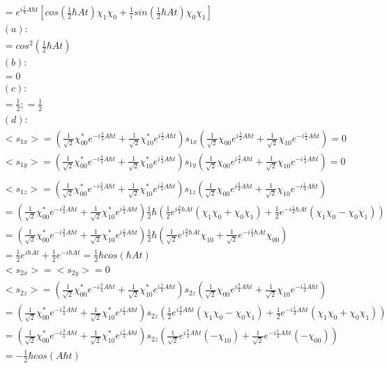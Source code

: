 \documentclass{article}
\begin{document}
\begin{align*}
  &= e^{i\frac14 A\hbar t}[cos(\frac12\hbar At)\chi_1\chi_0+\frac1isin(\frac12\hbar At)\chi_0\chi_1]\\
  &(a):\\
  &=cos^2(\frac12\hbar At)\\
  &(b):\\
  &=0\\
  &(c):\\
  &=\frac12;=\frac12\\
  &(d):\\
  &<s_{1x}>=(\frac1{\sqrt{2}}\chi_{00}^*e^{-i\frac34A\hbar t}+\frac1{\sqrt{2}}\chi_{10}^*e^{i\frac14A\hbar t})s_{1x}(\frac1{\sqrt{2}}\chi_{00}e^{i\frac34A\hbar t}+\frac1{\sqrt{2}}\chi_{10}e^{-i\frac14A\hbar t})=0\\
  &<s_{1y}>=(\frac1{\sqrt{2}}\chi_{00}^*e^{-i\frac34A\hbar t}+\frac1{\sqrt{2}}\chi_{10}^*e^{i\frac14A\hbar t})s_{1y}(\frac1{\sqrt{2}}\chi_{00}e^{i\frac34A\hbar t}+\frac1{\sqrt{2}}\chi_{10}e^{-i\frac14A\hbar t})=0\\
\end{align*}
\begin{align*}
  &<s_{1z}>=(\frac1{\sqrt{2}}\chi_{00}^*e^{-i\frac34A\hbar t}+\frac1{\sqrt{2}}\chi_{10}^*e^{i\frac14A\hbar t})s_{1z}(\frac1{\sqrt{2}}\chi_{00}e^{i\frac34A\hbar t}+\frac1{\sqrt{2}}\chi_{10}e^{-i\frac14A\hbar t})\\
  &=(\frac1{\sqrt{2}}\chi_{00}^*e^{-i\frac34A\hbar t}+\frac1{\sqrt{2}}\chi_{10}^*e^{i\frac14A\hbar t})\frac12\hbar(\frac1{2}e^{i\frac34\hbar At}(\chi_1\chi_0+\chi_0\chi_1)+\frac12e^{-i\frac14\hbar At}(\chi_1\chi_0-\chi_0\chi_1))\\
  &=(\frac1{\sqrt{2}}\chi_{00}^*e^{-i\frac34A\hbar t}+\frac1{\sqrt{2}}\chi_{10}^*e^{i\frac14A\hbar t})\frac12\hbar(\frac1{\sqrt{2}}e^{i\frac34\hbar At}\chi_{10}+\frac1{\sqrt{2}}e^{-i\frac14\hbar At}\chi_{00})\\
  &=\frac12e^{i\hbar At}+\frac12e^{-i\hbar At}=\frac12\hbar cos(\hbar At)\\
  &<s_{2x}>=<s_{2y}>=0\\
  &<s_{2z}>=(\frac1{\sqrt{2}}\chi_{00}^*e^{-i\frac34A\hbar t}+\frac1{\sqrt{2}}\chi_{10}^*e^{i\frac14A\hbar t})s_{2z}(\frac1{\sqrt{2}}\chi_{00}e^{i\frac34A\hbar t}+\frac1{\sqrt{2}}\chi_{10}e^{-i\frac14A\hbar t})\\
  &=(\frac1{\sqrt{2}}\chi_{00}^*e^{-i\frac34A\hbar t}+\frac1{\sqrt{2}}\chi_{10}^*e^{i\frac14A\hbar t})s_{2z}(\frac12e^{i\frac34A\hbar t}(\chi_1\chi_0-\chi_0\chi_1)+\frac12e^{-i\frac14A\hbar t}(\chi_1\chi_0+\chi_0\chi_1))\\
  &=(\frac1{\sqrt{2}}\chi_{00}^*e^{-i\frac34A\hbar t}+\frac1{\sqrt{2}}\chi_{10}^*e^{i\frac14A\hbar t})s_{2z}(\frac1{\sqrt{2}}e^{i\frac34A\hbar t}(-\chi_{10})+\frac1{\sqrt{2}}e^{-i\frac14A\hbar t}(-\chi_{00}))\\
  &=-\frac12\hbar cos(A\hbar t)
\end{align*}
\end{document}
